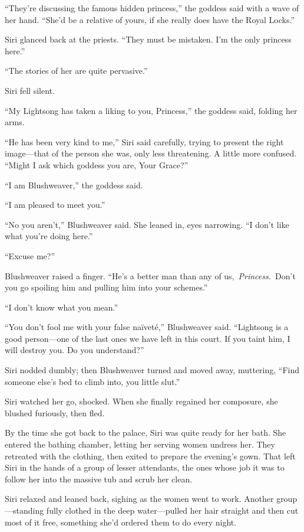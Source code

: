 “They’re discussing the famous hidden princess,” the goddess said with a wave of her hand. “She’d be a relative of yours, if she really does have the Royal Locks.”

Siri glanced back at the priests. “They must be mistaken. I’m the only princess here.”

“The stories of her are quite pervasive.”

Siri fell silent.

“My Lightsong has taken a liking to you, Princess,” the goddess said, folding her arms.

“He has been very kind to me,” Siri said carefully, trying to present the right image—that of the person she was, only less threatening. A little more confused. “Might I ask which goddess you are, Your Grace?”

“I am Blushweaver,” the goddess said.

“I am pleased to meet you.”

“No you aren’t,” Blushweaver said. She leaned in, eyes narrowing. “I don’t like what you’re doing here.”

“Excuse me?”

Blushweaver raised a finger. “He’s a better man than any of us,~\textit{Princess.}~Don’t you go spoiling him and pulling him into your schemes.”

“I don’t know what you mean.”

“You don’t fool me with your false na{\"i}vet{\'e},” Blushweaver said. “Lightsong is a good person—one of the last ones we have left in this court. If you taint him, I will destroy you. Do you understand?”

Siri nodded dumbly; then Blushweaver turned and moved away, muttering, “Find someone else’s bed to climb into, you little slut.”

Siri watched her go, shocked. When she finally regained her composure, she blushed furiously, then fled.

\orn

By the time she got back to the palace, Siri was quite ready for her bath. She entered the bathing chamber, letting her serving women undress her. They retreated with the clothing, then exited to prepare the evening’s gown. That left Siri in the hands of a group of lesser attendants, the ones whose job it was to follow her into the massive tub and scrub her clean.

Siri relaxed and leaned back, sighing as the women went to work. Another group—standing fully clothed in the deep water—pulled her hair straight and then cut most of it free, something she’d ordered them to do every night.

